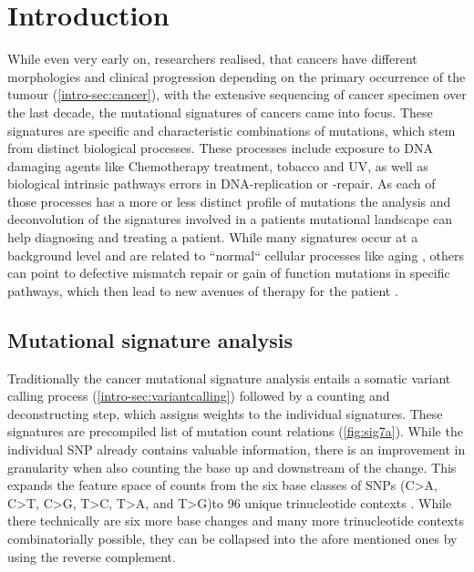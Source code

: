 \section{Introduction}
\label{mmf-sec:intro}

While even very early on, researchers realised, that cancers have different morphologies and clinical progression depending on the primary occurrence of the tumour (\autoref{intro-sec:cancer}), with the extensive sequencing of cancer specimen over the last decade, the mutational signatures of cancers came into focus. These signatures are specific and characteristic combinations of mutations, which stem from distinct biological processes. These processes include exposure to DNA damaging agents like Chemotherapy treatment, tobacco and UV, as well as biological intrinsic pathways errors in DNA-replication or -repair. As each of those processes has a more or less distinct profile of mutations \cite{Hollstein1991,Kucab2019} the analysis and deconvolution of the signatures involved in a patients mutational landscape can help diagnosing and treating a patient. While many signatures occur at a background level and are related to ``normal`` cellular processes like aging \cite{Alexandrov2013}, others can point to defective mismatch repair or gain of function mutations in specific pathways, which then lead to new avenues of therapy for the patient \cite{OtextquotesingleNeil2017}.

\subsection{Mutational signature analysis}
Traditionally the cancer mutational signature analysis entails a somatic variant calling process (\autoref{intro-sec:variantcalling}) followed by a counting and deconstructing step, which assigns weights to the individual signatures. These signatures are precompiled list of mutation count relations (\autoref{fig:sig7a}). While the individual SNP already contains valuable information, there is an improvement in granularity when also counting the base up and downstream of the change. This expands the feature space of counts from the six base classes of SNPs (C>A, C>T, C>G, T>C, T>A, and T>G)to 96 unique trinucleotide contexts \cite{Alexandrov2013}. While there technically are six more base changes and many more trinucleotide contexts combinatorially possible, they can be collapsed into the afore mentioned ones by using the reverse complement.


